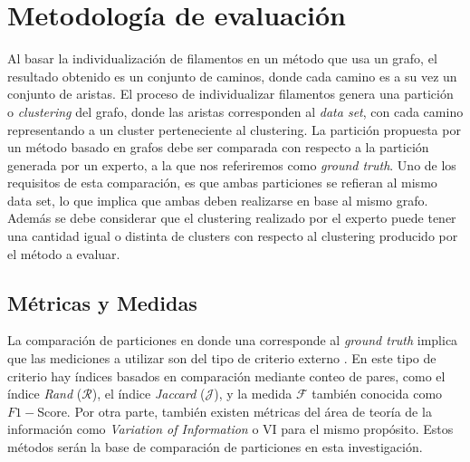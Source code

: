 \chapter{Metodolog\'ia de evaluaci\'on}
\label{chap:metodologia}

Al basar la individualizaci\'on de filamentos en un m\'etodo que usa un grafo, el resultado obtenido es un conjunto de caminos, donde cada camino es a su vez un conjunto de aristas. El proceso de individualizar filamentos genera una partici\'on o {\it clustering} del grafo, donde las aristas corresponden al {\it data set}, con cada camino representando a un cluster perteneciente al clustering. La partici\'on propuesta por un m\'etodo basado en grafos debe ser comparada con respecto a la partici\'on generada por un experto, a la que nos referiremos como {\it ground truth}. Uno de los requisitos de esta comparaci\'on, es que ambas particiones se refieran al mismo data set, lo que implica que ambas deben realizarse en base al mismo grafo. Adem\'as se debe considerar que el clustering realizado por el experto puede tener una cantidad igual o distinta de clusters con respecto al clustering producido por el m\'etodo a evaluar.



\section{M\'etricas y Medidas}
\label{sec:metricasymedidas}


La comparaci\'on de particiones en donde una corresponde al {\it ground truth} implica que las mediciones a utilizar son del tipo de criterio externo . En este tipo de criterio hay \'indices basados en comparaci\'on mediante conteo de pares, como el \'indice {\it Rand} ($\mathcal{R}$), el \'indice {\it Jaccard} ($\mathcal{J}$), y la medida $\mathcal{F}$ tambi\'en conocida como $F1-$Score. Por otra parte, tambi\'en existen m\'etricas del \'area de teor\'ia de la informaci\'on como {\it Variation of Information} o VI para el mismo prop\'osito. Estos m\'etodos ser\'an la base de comparaci\'on de particiones en esta investigaci\'on.

